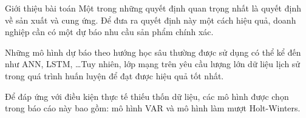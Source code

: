 \begin{frame}{Giới thiệu bài toán}
     Một trong những quyết định quan trọng nhất là quyết định
về sản xuất và cung ứng. Để đưa ra quyết định này một cách hiệu quả, doanh
nghiệp cần có một dự báo nhu cầu sản phẩm chính xác.

Những mô hình dự báo theo hướng học sâu thường được sử dụng có thể kể đến như ANN, LSTM, \dots Tuy nhiên, lớp mạng trên yêu cầu lượng lớn dữ liệu lịch sử trong quá trình huấn luyện để đạt được hiệu quả tốt nhất.

 Để đáp ứng với điều kiện thực tế thiếu thốn dữ liệu, các mô hình được chọn trong báo cáo này bao gồm: mô hình VAR và mô hình làm mượt Holt-Winters.
\end{frame}

